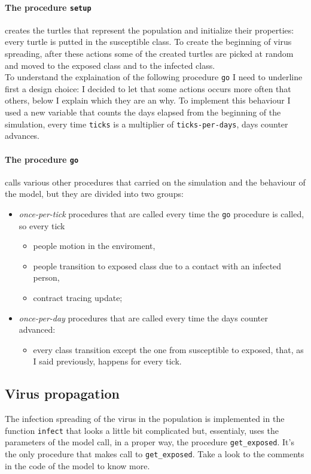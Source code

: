 \documentclass[12pt]{llncs}
\begin{document}
\paragraph{The procedure \texttt{setup}} creates the turtles that represent the population and initialize their properties: every turtle is putted in the susceptible class. To create the beginning of virus spreading, after these actions some of the created turtles are picked at random and moved to the exposed class and to the infected class.\\

To understand the explaination of the following procedure \texttt{go} I need to underline first a design choice: I decided to let that some actions occurs more often that others, below I explain which they are an why. To implement this behaviour I used a new variable that counts the days elapsed from the beginning of the simulation, every time \texttt{ticks} is a multiplier of \texttt{ticks-per-days}, days counter advances.\\

\paragraph{The procedure \texttt{go}} calls various other procedures that carried on the simulation and the behaviour of the model, but they are divided into two groups:
\begin{itemize}
\item \textit{once-per-tick} procedures that are called every time the \texttt{go} procedure is called, so every tick
\begin{itemize}
\item people motion in the enviroment, 
\item people transition to exposed class due to a contact with an infected person,
\item contract tracing update;
\end{itemize}
\item \textit{once-per-day} procedures that are called every time the days counter advanced:
\begin{itemize}
\item every class transition except the one from susceptible to exposed, that, as I said previously, happens for every tick.
\end{itemize}
\end{itemize}

\subsection{Virus propagation}
The infection spreading of the virus in the population is implemented in the function \texttt{infect} that looks a little bit complicated but, essentialy, uses the parameters of the model call, in a proper way, the procedure \texttt{get\_exposed}. It's the only procedure that makes call to \texttt{get\_exposed}. Take a look to the comments in the code of the model to know more.
\end{document}
